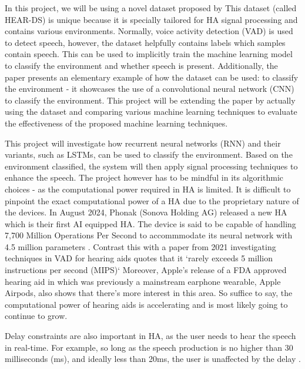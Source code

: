 \documentclass[logo,bsc,singlespacing,parskip,online]{infthesis}
\begin{document}
In this project, we will be using a novel dataset proposed by \citet{Huwel2020HearDS}
This dataset (called HEAR-DS) is unique because it is specially tailored for HA signal processing and contains
various environments. Normally, voice activity detection (VAD) is used to
detect speech, however, the dataset helpfully contains 
labels which samples contain speech. This can be used 
to implicitly train the machine learning model to classify the environment 
and whether speech is present. Additionally, the paper presents an 
elementary example of how the dataset can be used: to classify the environment -
it showcases the use of a
convolutional neural network (CNN) to classify the environment.
This project will be extending the paper by actually using the dataset 
and comparing various machine learning techniques to evaluate the
effectiveness of the proposed machine learning techniques. 

This project will investigate how recurrent neural networks (RNN) and 
their variants, such as LSTMs, can be used to classify the environment.
 Based on the environment classified, the system will then apply
signal processing techniques to enhance the speech. 
The project 
however has to be mindful in its algorithmic choices - as the computational
power required in HA is limited. It is difficult to pinpoint the exact computational power of a HA
due to the proprietary nature of the devices. In August 2024,
Phonak (Sonova Holding AG) released a new HA which is their first AI 
equipped HA. The device is said to be capable of handling 7,700 Million 
Operations Per Second to accommmodate its neural network with 4.5 million parameters \cite{Hasemann2024PhonakSphere}.  Contrast this with a paper 
from 2021 investigating techniques in VAD for hearing aids 
quotes that it `rarely exceeds 5 million instructions per second (MIPS)` \cite{Gomez2021MIPS}
Moreover, Apple's release of a FDA approved hearing aid in which was previously a mainstream earphone wearable,
Apple Airpods, also shows that there's more interest in this area.
So suffice to say, the computational power of hearing aids is accelerating 
and is most likely going to continue to grow. 

Delay constraints are also
important in HA, as the user needs to hear the speech in real-time.
For example, so long as the speech production is no higher 
than 30 milliseconds (ms), and ideally less than 20ms, the user
is unaffected by the delay \cite{Stone2002Delays}.


%
\end{document}
